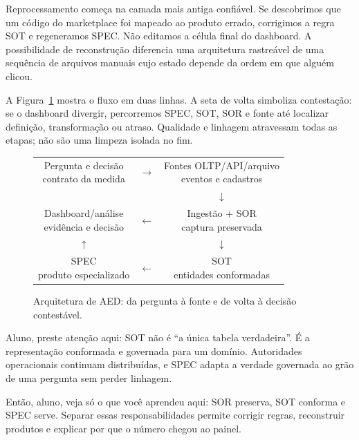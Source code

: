 Reprocessamento começa na camada mais antiga confiável. Se descobrimos que um código do marketplace foi mapeado ao produto errado, corrigimos a regra SOT e regeneramos SPEC. Não editamos a célula final do dashboard. A possibilidade de reconstrução diferencia uma arquitetura rastreável de uma sequência de arquivos manuais cujo estado depende da ordem em que alguém clicou.

A Figura~\ref{fig:arquitetura-aed} mostra o fluxo em duas linhas. A seta de volta simboliza contestação: se o dashboard divergir, percorremos SPEC, SOT, SOR e fonte até localizar definição, transformação ou atraso. Qualidade e linhagem atravessam todas as etapas; não são uma limpeza isolada no fim.

\begin{figure}[htbp]
\centering
\small
\begin{tabular}{ccc}
\fbox{\parbox{3.3cm}{\centering Pergunta e decisão\\contrato da medida}} & $\longrightarrow$ & \fbox{\parbox{3.3cm}{\centering Fontes OLTP/API/arquivo\\eventos e cadastros}} \\
&& $\downarrow$ \\
\fbox{\parbox{3.3cm}{\centering Dashboard/análise\\evidência e decisão}} & $\longleftarrow$ & \fbox{\parbox{3.3cm}{\centering Ingestão + SOR\\captura preservada}} \\
$\uparrow$ && $\downarrow$ \\
\fbox{\parbox{3.3cm}{\centering SPEC\\produto especializado}} & $\longleftarrow$ & \fbox{\parbox{3.3cm}{\centering SOT\\entidades conformadas}} \\
\end{tabular}
\caption{Arquitetura de AED: da pergunta à fonte e de volta à decisão contestável.}
\label{fig:arquitetura-aed}
\end{figure}

\begin{GuidedBox}
Aluno, preste atenção aqui: SOT não é ``a única tabela verdadeira''. É a representação conformada e governada para um domínio. Autoridades operacionais continuam distribuídas, e SPEC adapta a verdade governada ao grão de uma pergunta sem perder linhagem.
\end{GuidedBox}

\begin{SummaryBox}
Então, aluno, veja só o que você aprendeu aqui: SOR preserva, SOT conforma e SPEC serve. Separar essas responsabilidades permite corrigir regras, reconstruir produtos e explicar por que o número chegou ao painel.
\end{SummaryBox}

